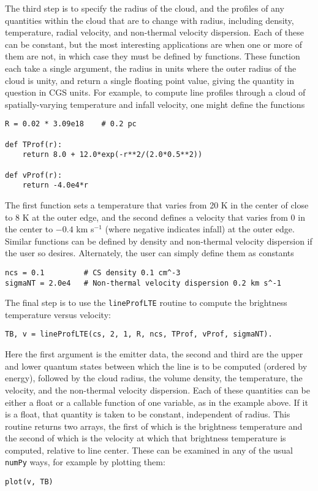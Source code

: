 \documentclass[12pt]{article}
\begin{document}
The third step is to specify the radius of the cloud, and the profiles of any quantities within the cloud that are to change with radius, including density, temperature, radial velocity, and non-thermal velocity dispersion. Each of these can be constant, but the most interesting applications are when one or more of them are not, in which case they must be defined by functions. These function each take a single argument, the radius in units where the outer radius of the cloud is unity, and return a single floating point value, giving the quantity in question in CGS units. For example, to compute line profiles through a cloud of spatially-varying temperature and infall velocity, one might define the functions
\begin{verbatim}
R = 0.02 * 3.09e18    # 0.2 pc

def TProf(r):
    return 8.0 + 12.0*exp(-r**2/(2.0*0.5**2))

def vProf(r):
    return -4.0e4*r
\end{verbatim}
The first function sets a temperature that varies from 20 K in the center of close to 8 K at the outer edge, and the second defines a velocity that varies from 0 in the center to $-0.4$ km s$^{-1}$ (where negative indicates infall) at the outer edge. Similar functions can be defined by density and non-thermal velocity dispersion if the user so desires. Alternately, the user can simply define them as constants
\begin{verbatim}
ncs = 0.1         # CS density 0.1 cm^-3
sigmaNT = 2.0e4   # Non-thermal velocity dispersion 0.2 km s^-1
\end{verbatim}

The final step is to use the \verb=lineProfLTE= routine to compute the brightness temperature versus velocity:
\begin{verbatim}
TB, v = lineProfLTE(cs, 2, 1, R, ncs, TProf, vProf, sigmaNT).
\end{verbatim}
Here the first argument is the emitter data, the second and third are the upper and lower quantum states between which the line is to be computed (ordered by energy), followed by the cloud radius, the volume density, the temperature, the velocity, and the non-thermal velocity dispersion. Each of these quantities can be either a float or a callable function of one variable, as in the example above. If it is a float, that quantity is taken to be constant, independent of radius. This routine returns two arrays, the first of which is the brightness temperature and the second of which is the velocity at which that brightness temperature is computed, relative to line center. These can be examined in any of the usual \verb=numPy= ways, for example by plotting them:
\begin{verbatim}
plot(v, TB)
\end{verbatim}
\end{document}
